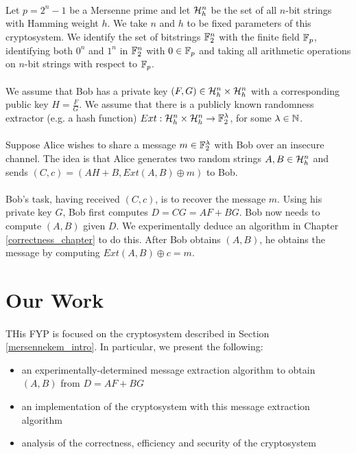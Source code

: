 \paragraph{}
Let $p = 2^n - 1$ be a Mersenne prime and let $\mathcal{H}_h^n$ be the set of all $n$-bit strings with Hamming weight $h$. We take $n$ and $h$ to be fixed parameters of this cryptosystem. We identify the set of bitstrings $\mathbb{F}_2^n$ with the finite field $\mathbb{F}_p$, identifying both $0^n$ and $1^n$ in $\mathbb{F}_2^n$ with $0 \in \mathbb{F}_p$ and taking all arithmetic operations on $n$-bit strings with respect to $\mathbb{F}_p$.

\paragraph{}
We assume that Bob has a private key $(F,G) \in \mathcal{H}_h^n \times \mathcal{H}_h^n$ with a corresponding public key $H = \frac{F}{G}$. We assume that there is a publicly known randomness extractor (e.g. a hash function) $Ext: \mathcal{H}_h^n \times \mathcal{H}_h^n \rightarrow \mathbb{F}_2^\lambda$, for some $\lambda \in \mathbb{N}$.

\paragraph{}
Suppose Alice wishes to share a message $m \in \mathbb{F}_2^\lambda$ with Bob over an insecure channel. The idea is that Alice generates two random strings $A, B \in \mathcal{H}_h^n$ and sends $(C, c) = (AH + B, Ext(A, B) \oplus m)$ to Bob.

\paragraph{}
Bob's task, having received $(C, c)$, is to recover the message $m$. Using his private key $G$, Bob first computes $D = CG = AF + BG$. Bob now needs to compute $(A, B)$ given $D$. We experimentally deduce an algorithm in Chapter \ref{correctness_chapter} to do this. After Bob obtains $(A, B)$, he obtains the message by computing $Ext(A, B) \oplus c = m$.

\section{Our Work}
\paragraph{}
THis FYP is focused on the cryptosystem described in Section \ref{mersennekem_intro}. In particular, we present the following:
\begin{itemize}
    \item an experimentally-determined message extraction algorithm to obtain $(A, B)$ from $D = AF + BG$
    \item an implementation of the cryptosystem with this message extraction algorithm
    \item analysis of the correctness, efficiency and security of the cryptosystem
\end{itemize}


